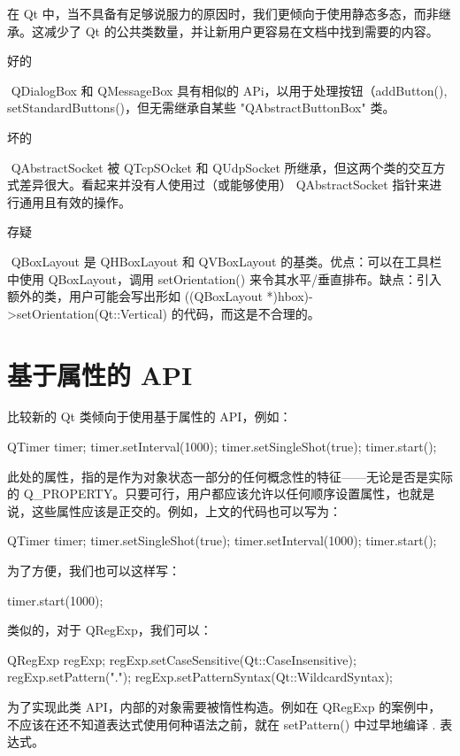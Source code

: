 在 Qt 中，当不具备有足够说服力的原因时，我们更倾向于使用静态多态，而非继承。这减少了 Qt 的公共类数量，并让新用户更容易在文档中找到需要的内容。

好的

​ QDialogBox 和 QMessageBox 具有相似的 APi，以用于处理按钮（addButton(), setStandardButtons()，但无需继承自某些 "QAbstractButtonBox" 类。

坏的

​ QAbstractSocket 被 QTcpSOcket 和 QUdpSocket 所继承，但这两个类的交互方式差异很大。看起来并没有人使用过（或能够使用） QAbstractSocket 指针来进行通用且有效的操作。

存疑

​ QBoxLayout 是 QHBoxLayout 和 QVBoxLayout 的基类。优点：可以在工具栏中使用 QBoxLayout，调用 setOrientation() 来令其水平/垂直排布。缺点：引入额外的类，用户可能会写出形如 ((QBoxLayout *)hbox)->setOrientation(Qt::Vertical) 的代码，而这是不合理的。

\section{基于属性的 API}

比较新的 Qt 类倾向于使用基于属性的 API，例如：

\begin{cppcode}
QTimer timer;
timer.setInterval(1000);
timer.setSingleShot(true);
timer.start();
\end{cppcode}

此处的属性，指的是作为对象状态一部分的任何概念性的特征——无论是否是实际的 Q\_PROPERTY。只要可行，用户都应该允许以任何顺序设置属性，也就是说，这些属性应该是正交的。例如，上文的代码也可以写为：

\begin{cppcode}
QTimer timer;
timer.setSingleShot(true);
timer.setInterval(1000);
timer.start();
\end{cppcode}

为了方便，我们也可以这样写：

\begin{cppcode}
timer.start(1000);
\end{cppcode}

类似的，对于 QRegExp，我们可以：

\begin{cppcode}
QRegExp regExp;
regExp.setCaseSensitive(Qt::CaseInsensitive);
regExp.setPattern(".");
regExp.setPatternSyntax(Qt::WildcardSyntax);
\end{cppcode}

为了实现此类 API，内部的对象需要被惰性构造。例如在 QRegExp 的案例中，不应该在还不知道表达式使用何种语法之前，就在 setPattern() 中过早地编译 . 表达式。

